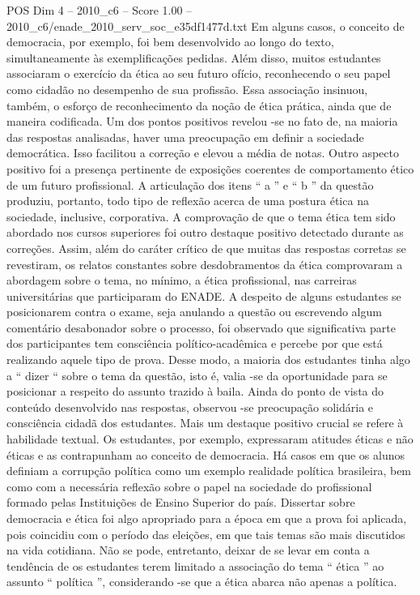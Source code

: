 \begin{textsample}{POS Dim 4 – 2010\_c6 – Score 1.00 – 2010\_c6/enade\_2010\_serv\_soc\_e35df1477d.txt}
Em alguns casos, o conceito de democracia, por exemplo, foi bem desenvolvido ao longo do texto, simultaneamente às exemplificações pedidas.
Além disso, muitos estudantes associaram o exercício da ética ao seu futuro ofício, reconhecendo o seu papel como cidadão no desempenho de sua profissão.
Essa associação insinuou, também, o esforço de reconhecimento da noção de ética prática, ainda que de maneira codificada.
Um dos pontos positivos revelou -se no fato de, na maioria das respostas analisadas, haver uma preocupação em definir a sociedade democrática.
Isso facilitou a correção e elevou a média de notas.
Outro aspecto positivo foi a presença pertinente de exposições coerentes de comportamento ético de um futuro profissional.
A articulação dos itens “ a ” e “ b ” da questão produziu, portanto, todo tipo de reflexão acerca de uma postura ética na sociedade, inclusive, corporativa.
A comprovação de que o tema ética tem sido abordado nos cursos superiores foi outro destaque positivo detectado durante as correções.
Assim, além do caráter crítico de que muitas das respostas corretas se revestiram, os relatos constantes sobre desdobramentos da ética comprovaram a abordagem sobre o tema, no mínimo, a ética profissional, nas carreiras universitárias que participaram do ENADE.
A despeito de alguns estudantes se posicionarem contra o exame, seja anulando a questão ou escrevendo algum comentário desabonador sobre o processo, foi observado que significativa parte dos participantes tem consciência político-acadêmica e percebe por que está realizando aquele tipo de prova.
Desse modo, a maioria dos estudantes tinha algo a “ dizer “ sobre o tema da questão, isto é, valia -se da oportunidade para se posicionar a respeito do assunto trazido à baila.
Ainda do ponto de vista do conteúdo desenvolvido nas respostas, observou -se preocupação solidária e consciência cidadã dos estudantes.
Mais um destaque positivo crucial se refere à habilidade textual.
Os estudantes, por exemplo, expressaram atitudes éticas e não éticas e as contrapunham ao conceito de democracia.
Há casos em que os alunos definiam a corrupção política como um exemplo realidade política brasileira, bem como com a necessária reflexão sobre o papel na sociedade do profissional formado pelas Instituições de Ensino Superior do país.
Dissertar sobre democracia e ética foi algo apropriado para a época em que a prova foi aplicada, pois coincidiu com o período das eleições, em que tais temas são mais discutidos na vida cotidiana.
Não se pode, entretanto, deixar de se levar em conta a tendência de os estudantes terem limitado a associação do tema “ ética ” ao assunto “ política ”, considerando -se que a ética abarca não apenas a política.

\end{textsample}

